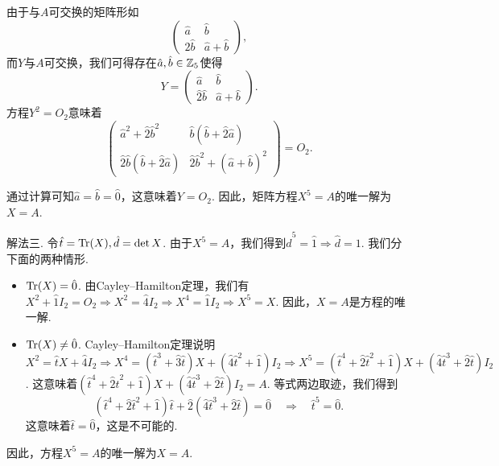 \begin{solution}
\begin{inparaenum}[(a)]
    由于与$A$可交换的矩阵形如
    \[
      \begin{pmatrix}
        \hat a & \hat b \\
        \hat 2\hat b & \hat a + \hat b
      \end{pmatrix},
    \]
    而$Y$与$A$可交换，我们可得存在$\hat a,\hat b\in\mathbb Z_5$使得
    \[
      Y = \begin{pmatrix}
        \hat a & \hat b \\
        \hat 2\hat b & \hat a + \hat b
      \end{pmatrix}.
    \]
    方程$Y^2=O_2$意味着
    \[
      \begin{pmatrix}
        \hat a^2 + \hat 2\hat b^2 & \hat b \left( \hat b+\hat 2\hat a\right) \\
        \hat 2\hat b\left( \hat b+\hat 2\hat a\right) & \hat 2\hat b^2 + \left(\hat a + \hat b\right)^2
      \end{pmatrix} = O_2.
    \]

    通过计算可知$\hat a= \hat b=\hat0$，这意味着$Y=O_2$. 因此，矩阵方程$X^5=A$的唯一解为$X=A$.

    {\kaishu 解法三.} 令$\hat t=\operatorname{Tr}(X),\hat d=\det X$. 由于$X^5=A$，我们得到$\hat d^5=\hat1\Rightarrow\hat d=1$. 我们分下面的两种情形.
  \end{inparaenum}
  \begin{itemize}
      \item $\operatorname{Tr}(X)=\hat0$. 由Cayley--Hamilton定理，我们有$X^2+\hat1I_2=O_2\Rightarrow X^2=\hat4I_2\Rightarrow X^4=\hat1I_2\Rightarrow X^5=X$. 因此，$X=A$是方程的唯一解.

      \item $\operatorname{Tr}(X)\ne\hat0$. Cayley--Hamilton定理说明$X^2=\hat tX+\hat4I_2\Rightarrow X^4=\left(\hat t^3+\hat3\hat t\right)X+\left(\hat4\hat t^2+\hat1\right)I_2\Rightarrow X^5=
          \left(\hat t^4+\hat2\hat t^2+\hat 1 \right)X+\left(\hat4\hat t^3+\hat 2\hat t\right)I_2$. 这意味着$\left(\hat t^4+\hat2\hat t^2+\hat 1 \right)X+\left(\hat4\hat t^3+\hat 2\hat t\right)I_2=A$. 等式两边取迹，我们得到
          \[
            \left(\hat t^4 + \hat2\hat t^2 + \hat 1 \right)\hat t + \hat 2\left(\hat4\hat t^3 + \hat 2\hat t\right) = \hat 0 \quad \Rightarrow \quad \hat t^5 = \hat 0.
          \]
          这意味着$\hat t=\hat0$，这是不可能的.
    \end{itemize}
    因此，方程$X^5=A$的唯一解为$X=A$.


\end{solution}
